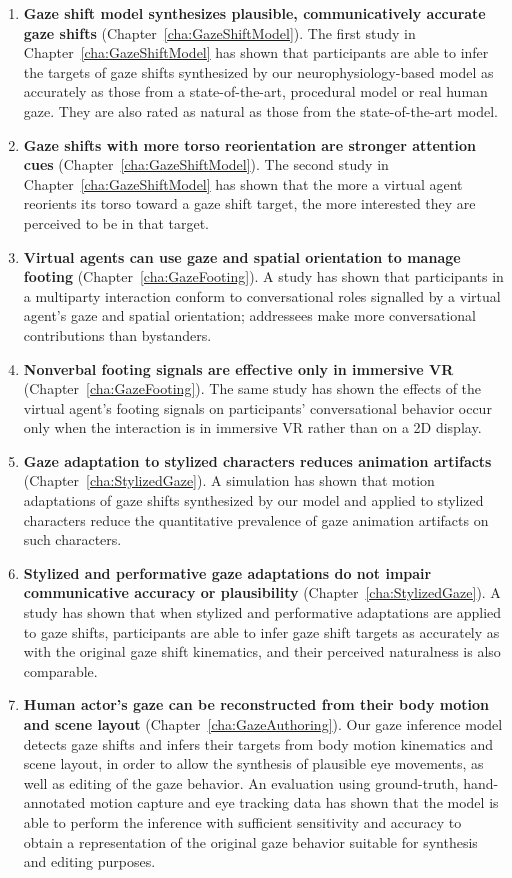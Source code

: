 \begin{enumerate}
\item \textbf{Gaze shift model synthesizes plausible, communicatively accurate gaze shifts} (Chapter~\ref{cha:GazeShiftModel}). The first study in Chapter~\ref{cha:GazeShiftModel} has shown that participants are able to infer the targets of gaze shifts synthesized by our neurophysiology-based model as accurately as those from a state-of-the-art, procedural model or real human gaze. They are also rated as natural as those from the state-of-the-art model.
\item \textbf{Gaze shifts with more torso reorientation are stronger attention cues} (Chapter~\ref{cha:GazeShiftModel}). The second study in Chapter~\ref{cha:GazeShiftModel} has shown that the more a virtual agent reorients its torso toward a gaze shift target, the more interested they are perceived to be in that target.
\item \textbf{Virtual agents can use gaze and spatial orientation to manage footing} (Chapter~\ref{cha:GazeFooting}). A study has shown that participants in a multiparty interaction conform to conversational roles signalled by a virtual agent's gaze and spatial orientation; addressees make more conversational contributions than bystanders.
\item \textbf{Nonverbal footing signals are effective only in immersive VR} (Chapter~\ref{cha:GazeFooting}). The same study has shown the effects of the virtual agent's footing signals on participants' conversational behavior occur only when the interaction is in immersive VR rather than on a 2D display.
\item \textbf{Gaze adaptation to stylized characters reduces animation artifacts} (Chapter~\ref{cha:StylizedGaze}). A simulation has shown that motion adaptations of gaze shifts synthesized by our model and applied to stylized characters reduce the quantitative prevalence of gaze animation artifacts on such characters.
\item \textbf{Stylized and performative gaze adaptations do not impair communicative accuracy or plausibility} (Chapter~\ref{cha:StylizedGaze}). A study has shown that when stylized and performative adaptations are applied to gaze shifts, participants are able to infer gaze shift targets as accurately as with the original gaze shift kinematics, and their perceived naturalness is also comparable.
\item \textbf{Human actor's gaze can be reconstructed from their body motion and scene layout} (Chapter~\ref{cha:GazeAuthoring}). Our gaze inference model detects gaze shifts and infers their targets from body motion kinematics and scene layout, in order to allow the synthesis of plausible eye movements, as well as editing of the gaze behavior. An evaluation using ground-truth, hand-annotated motion capture and eye tracking data has shown that the model is able to perform the inference with sufficient sensitivity and accuracy to obtain a representation of the original gaze behavior suitable for synthesis and editing purposes.

\end{enumerate}
